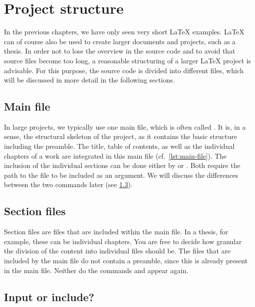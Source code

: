 \chapter{Project structure}
\label{sec:project-structure}

In the previous chapters, we have only seen very short \LaTeX{} examples. \LaTeX{} can of course also be used to create larger documents and projects, such as a thesis. 
In order not to lose the overview in the source code and to avoid that source files become too long, a reasonable structuring of a larger \LaTeX{} project is advisable. For this purpose, the source code is divided into different files, which will be discussed in more detail in the following sections.

\section{Main file}

In large projects, we typically use one main file, which is often called . It is, in a sense, the structural skeleton of the project, as it contains the basic structure including the preamble. The title, table of contents, as well as the individual chapters of a work are integrated in this main file (cf.\ \cref{lst:main-file}). The inclusion of the individual sections can be done either by  or . Both require the path to the file to be included as an argument. We will discuss the differences between the two commands later (see \cref{sec:input-vs-include}).


\section{Section files}
Section files are files that are included within the main file. In a thesis, for example, these can be individual chapters. You are free to decide how granular the division of the content into individual files should be.
The files that are included by the main file do not contain a preamble, since this is already present in the main file. Neither do the commands  and  appear again.

\section{Input or include?}
\label{sec:input-vs-include}

